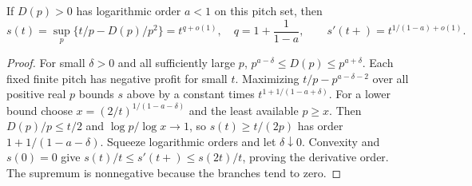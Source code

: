 \begin{lemma}
\label{lem:ruler-optimization}
If $D(p)>0$ has logarithmic order $a<1$ on this pitch set, then
\[
 s(t)=\sup_p\{t/p-D(p)/p^2\}=t^{q+o(1)},\quad
 q=1+\frac1{1-a},\qquad
 s'(t+)=t^{1/(1-a)+o(1)}.
\]
\end{lemma}
\begin{proof}
For small $\delta>0$ and all sufficiently large $p$,
$p^{a-\delta}\leq D(p)\leq p^{a+\delta}$. Each fixed finite pitch
has negative profit for small $t$. Maximizing
$t/p-p^{a-\delta-2}$ over all positive real $p$ bounds $s$ above
by a constant times $t^{1+1/(1-a+\delta)}$.
For a lower bound choose $x=(2/t)^{1/(1-a-\delta)}$ and the least
available $p\geq x$. Then $D(p)/p\leq t/2$ and
$\log p/\log x\to1$, so $s(t)\geq t/(2p)$ has order
$1+1/(1-a-\delta)$. Squeeze logarithmic orders and let
$\delta\downarrow0$. Convexity and $s(0)=0$ give
$s(t)/t\leq s'(t+)\leq s(2t)/t$, proving the derivative order.
The supremum is nonnegative because the branches tend to zero.
\end{proof}

